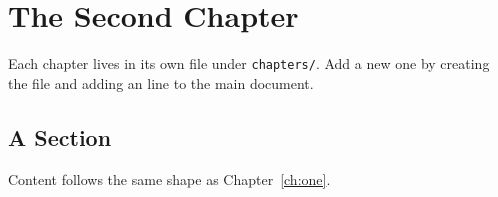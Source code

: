\chapter{The Second Chapter}
\label{ch:two}

Each chapter lives in its own file under \texttt{chapters/}. Add a new
one by creating the file and adding an \verb|| line to the main
document.

\section{A Section}

Content follows the same shape as Chapter~\ref{ch:one}.
